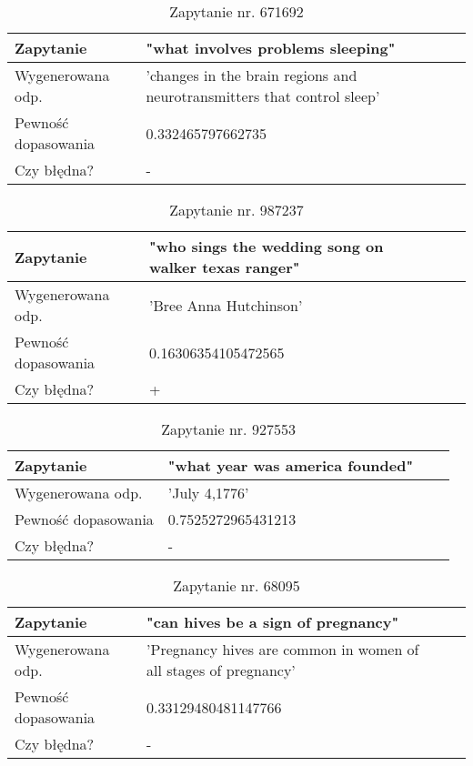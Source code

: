  \begin{table}[htp!]
\centering
\caption{Zapytanie nr. 671692\protect\footnotemark[2]}
\vspace*{5mm}
\begin{tabular}{llll}
   Zapytanie & "what involves problems sleeping"\\
   \hline
    Wygenerowana odp. & 'changes in the brain regions and neurotransmitters that control sleep' \\
    \hline
    Pewność dopasowania &  0.332465797662735\\
    \hline
    Czy błędna? & -\\
\end{tabular}
\end{table}

 \begin{table}[htp!]
\centering
\caption{Zapytanie nr. 987237\protect\footnotemark[2]}
\vspace*{5mm}
\begin{tabular}{llll}
   Zapytanie & "who sings the wedding song on walker texas ranger"\\
   \hline
    Wygenerowana odp. & 'Bree Anna Hutchinson' \\
    \hline
    Pewność dopasowania & 0.16306354105472565\\
    \hline
    Czy błędna? & +\\
\end{tabular}
\end{table}

 \begin{table}[htp!]
\centering
\caption{Zapytanie nr. 927553\protect\footnotemark[2]}
\vspace*{5mm}
\begin{tabular}{llll}
   Zapytanie & "what year was america founded"\\
   \hline
    Wygenerowana odp. & 'July 4,1776' \\
    \hline
    Pewność dopasowania & 0.7525272965431213\\
    \hline
    Czy błędna? & -\\
\end{tabular}
\end{table}

 \begin{table}[htp!]
\centering
\caption{Zapytanie nr. 68095\protect\footnotemark[2]}
\vspace*{5mm}
\begin{tabular}{llll}
   Zapytanie & "can hives be a sign of pregnancy"\\
   \hline
    Wygenerowana odp. & 'Pregnancy hives are common in women of all stages of pregnancy' \\
    \hline
    Pewność dopasowania &0.33129480481147766\\
    \hline
    Czy błędna? & -\\
\end{tabular}
\end{table}

